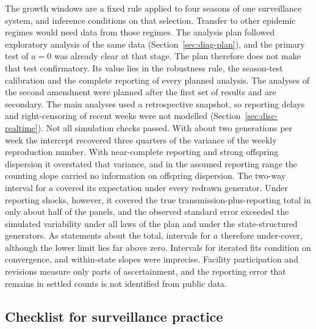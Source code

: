 The growth windows are a fixed rule applied to four seasons of one surveillance system, and inference conditions on that selection. Transfer to other epidemic regimes would need data from those regimes. The analysis plan followed exploratory analysis of the same data (Section~\ref{sec:diag-plan}), and the primary test of $a=0$ was already clear at that stage. The plan therefore does not make that test confirmatory. Its value lies in the robustness rule, the season-test calibration and the complete reporting of every planned analysis. The analyses of the second amendment were planned after the first set of results and are secondary. The main analyses used a retrospective snapshot, so reporting delays and right-censoring of recent weeks were not modelled (Section~\ref{sec:disc-realtime}). Not all simulation checks passed. With about two generations per week the intercept recovered three quarters of the variance of the weekly reproduction number. With near-complete reporting and strong offspring dispersion it overstated that variance, and in the assumed reporting range the counting slope carried no information on offspring dispersion. The two-way interval for $a$ covered its expectation under every redrawn generator. Under reporting shocks, however, it covered the true transmission-plus-reporting total in only about half of the panels, and the observed standard error exceeded the simulated variability under all laws of the plan and under the state-structured generators. As statements about the total, intervals for $a$ therefore under-cover, although the lower limit lies far above zero. Intervals for iterated fits condition on convergence, and within-state slopes were imprecise. Facility participation and revisions measure only parts of ascertainment, and the reporting error that remains in settled counts is not identified from public data.

\subsection{Checklist for surveillance practice}
\label{sec:disc-checklist}

